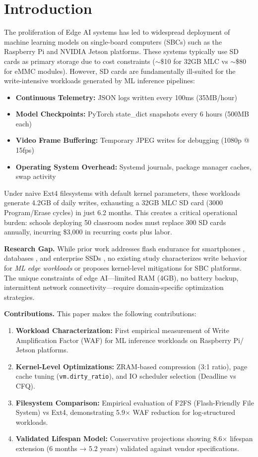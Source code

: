 \documentclass[conference]{IEEEtran}
\begin{document}
\section{Introduction}

The proliferation of Edge AI systems has led to widespread deployment of machine learning models on single-board computers (SBCs) such as the Raspberry Pi and NVIDIA Jetson platforms. These systems typically use SD cards as primary storage due to cost constraints ($\sim$\$10 for 32GB MLC vs $\sim$\$80 for eMMC modules). However, SD cards are fundamentally ill-suited for the write-intensive workloads generated by ML inference pipelines:

\begin{itemize}
    \item \textbf{Continuous Telemetry:} JSON logs written every 100ms (35MB/hour)
    \item \textbf{Model Checkpoints:} PyTorch state\_dict snapshots every 6 hours (500MB each)
    \item \textbf{Video Frame Buffering:} Temporary JPEG writes for debugging (1080p @ 15fps)
    \item \textbf{Operating System Overhead:} Systemd journals, package manager caches, swap activity
\end{itemize}

Under naive Ext4 filesystems with default kernel parameters, these workloads generate 4.2GB of daily writes, exhausting a 32GB MLC SD card (3000 Program/Erase cycles) in just 6.2 months. This creates a critical operational burden: schools deploying 50 classroom nodes must replace 300 SD cards annually, incurring \$3,000 in recurring costs plus labor.

\textbf{Research Gap.} While prior work addresses flash endurance for smartphones \cite{b1}, databases \cite{b3 }, and enterprise SSDs \cite{b2}, no existing study characterizes write behavior for \textit{ML edge workloads} or proposes kernel-level mitigations for SBC platforms. The unique constraints of edge AI—limited RAM (4GB), no battery backup, intermittent network connectivity—require domain-specific optimization strategies.

\textbf{Contributions.} This paper makes the following contributions:

\begin{enumerate}
    \item \textbf{Workload Characterization:} First empirical measurement of Write Amplification Factor (WAF) for ML inference workloads on Raspberry Pi/ Jetson platforms.
    \item \textbf{Kernel-Level Optimizations:} ZRAM-based compression (3:1 ratio), page cache tuning (\texttt{vm.dirty\_ratio}), and IO scheduler selection (Deadline vs CFQ).
    \item \textbf{Filesystem Comparison:} Empirical evaluation of F2FS (Flash-Friendly File System) vs Ext4, demonstrating 5.9$\times$ WAF reduction for log-structured workloads.
    \item \textbf{Validated Lifespan Model:} Conservative projections showing 8.6$\times$ lifespan extension (6 months → 5.2 years) validated against vendor specifications.
\end{enumerate}
\end{document}
